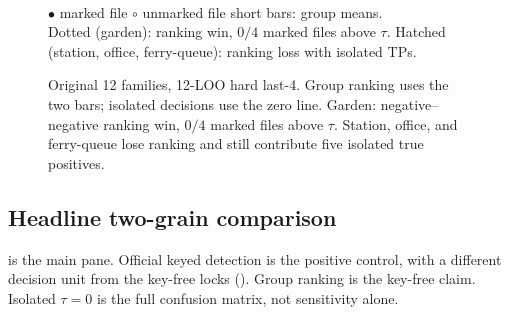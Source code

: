 \documentclass[11pt,a4paper]{article}
\theoremstyle{definition}
\begin{document}
\begin{figure}[ht]
\\[1.8em]
{\scriptsize\textcolor{blue!70!black}{$\bullet$ marked file}\quad
$\circ$ unmarked file\quad
short bars: group means.\\
Dotted (garden): ranking win, $0/4$ marked files above $\tau$.\quad
Hatched (station, office, ferry-queue): ranking loss with isolated TPs.}
\caption{Original 12 families, 12-LOO hard last-4. Group ranking uses
the two bars; isolated decisions use the zero line. Garden:
negative--negative ranking win, $0/4$ marked files above $\tau$.
Station, office, and ferry-queue lose ranking and still contribute five
isolated true positives.}
\label{fig:twograin}
\end{figure}

\subsection{Headline two-grain comparison}

 is the main pane. Official keyed detection is the
positive control, with a different decision unit from the key-free
locks (). Group ranking is the key-free claim.
Isolated $\tau=0$ is the full confusion matrix, not sensitivity alone.
\end{document}
